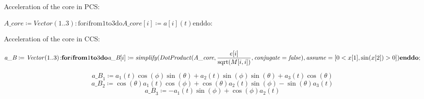 \documentclass{article}
\begin{document}
\begin{Maple Normal}
Acceleration of the core in PCS:
\end{Maple Normal}
\begin{Maple Normal}
{$ \displaystyle \textit{A\_core} \coloneqq \mathit{Vector} (1..3)\colon \boldsymbol{\mathrm{for}}i \boldsymbol{\mathrm{from}}1\boldsymbol{\mathrm{to}}3\boldsymbol{\mathrm{do}}\textit{A\_core} [i]\coloneqq a [i](t)\boldsymbol{\mathrm{end}}\boldsymbol{\mathrm{do}}\colon  $}
\end{Maple Normal}
\begin{Maple Normal}
Acceleration of the core in CCS:
\end{Maple Normal}
\begin{Maple Normal}
 
\end{Maple Normal}
\begin{Maple Normal}

\end{Maple Normal}
\begin{Maple Normal}
{$ \displaystyle \textit{a\_B} \coloneqq \mathit{Vector} (1..3)\colon 
\\
 \boldsymbol{\mathrm{for}}i \boldsymbol{\mathrm{from}}1\boldsymbol{\mathrm{to}}3\boldsymbol{\mathrm{do}}\textit{a\_B} [i]\coloneqq \mathit{simplify} (\mathit{DotProduct} (\textit{A\_core} ,\frac{e [i]}{\mathrm{sqrt}(M [i ,i])},\mathit{conjugate} =\mathit{false}),\mathit{assume} =[0<x [1],\sin (x [2])>0])\boldsymbol{\mathrm{end}}\boldsymbol{\mathrm{do}}; $}
\end{Maple Normal}
\begin{dmath*}
\textit{a\_B}_{1}\coloneqq a_{1}\! \left(t \right) \cos \! \left(\phi \right) \sin \! \left(\theta \right)+a_{2}\! \left(t \right) \sin \! \left(\phi \right) \sin \! \left(\theta \right)+a_{3}\! \left(t \right) \cos \! \left(\theta \right)
\end{dmath*}
\vspace{-\bigskipamount}
\begin{dmath*}
\textit{a\_B}_{2}\coloneqq \cos \! \left(\theta \right) a_{1}\! \left(t \right) \cos \! \left(\phi \right)+\cos \! \left(\theta \right) a_{2}\! \left(t \right) \sin \! \left(\phi \right)-\sin \! \left(\theta \right) a_{3}\! \left(t \right)
\end{dmath*}
\vspace{-\bigskipamount}
\begin{dmath}\label{(13)}
\textit{a\_B}_{3}\coloneqq -a_{1}\! \left(t \right) \sin \! \left(\phi \right)+\cos \! \left(\phi \right) a_{2}\! \left(t \right)
\end{dmath}
\end{document}
